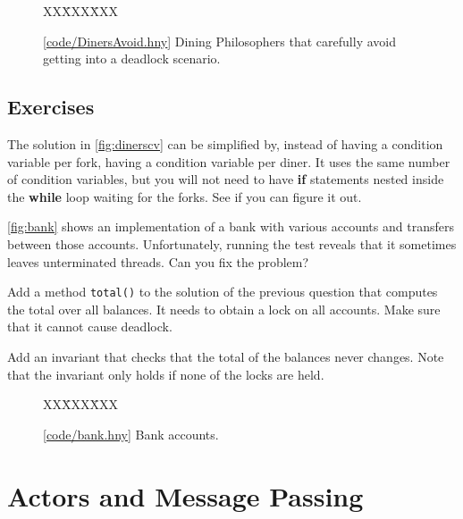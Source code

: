 \documentclass{report}
\newcommand{\harmonysource}[1]{
\begin{tabbing}
XX\=XXX\=XXX\kill
    
\end{tabbing}
}
\newcommand{\harmonylink}[1]{%
[\href{https://harmony.cs.cornell.edu/#1}{\underline{#1}}]%
}
\newenvironment{code}{
\tcolorbox
}{
\endtcolorbox
}
\begin{document}
\begin{figure}
\begin{code}
\harmonysource{DinersAvoid}
\end{code}
\caption{\harmonylink{code/DinersAvoid.hny} Dining Philosophers that carefully avoid getting into a deadlock
scenario.}
\label{fig:dinersavoid}
\end{figure}

\section*{Exercises}
\begin{problems}
\item The solution in \autoref{fig:dinerscv} can be simplified by, instead
of having a condition variable per fork, having a condition variable per
diner.  It uses the same number of condition variables, but you will not
need to have \textbf{if} statements nested inside the \textbf{while} loop
waiting for the forks.  See if you can figure it out.
\item \label{ex:bank} \autoref{fig:bank} shows an implementation of a bank with various
accounts and transfers between those accounts.
Unfortunately, running the test reveals that it sometimes leaves unterminated
threads.  Can you fix the problem?
\item Add a method \texttt{total()} to the solution of the previous question
that computes the total over all balances.
It needs to obtain a lock on all accounts.  Make sure that
it cannot cause deadlock.
\item Add an invariant that checks that the total of the balances never
changes.  Note that the invariant only holds if none of the locks are
held.
\end{problems}

\begin{figure}
\begin{code}
\harmonysource{bank}
\end{code}
\caption{\harmonylink{code/bank.hny} Bank accounts.}
\label{fig:bank}
\end{figure}

\chapter{Actors and Message Passing}
\label{ch:actor}
%
%

%
\end{document}
